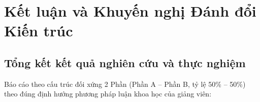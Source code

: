 
\section{Kết luận và Khuyến nghị Đánh đổi Kiến trúc}
\label{sec:ket_luan}

\subsection{Tổng kết kết quả nghiên cứu và thực nghiệm}

Báo cáo theo cấu trúc đối xứng 2 Phần (Phần A -- Phần B, tỷ lệ 50\% -- 50\%) theo đúng định hướng phương pháp luận khoa học của giảng viên:

